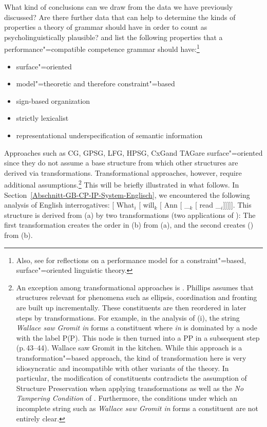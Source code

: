 What kind of conclusions can we draw from the data we have previously discussed? Are there further data that can help to determine the kinds
of properties a theory of grammar should have in order to count as psycholinguistically plausible? \citet*{SWB2003a} and \citet{SW2011a,SW2015a}
list the following properties that a performance"=compatible competence grammar should have:\footnote{%
  Also, see  for reflections on a performance model for a constraint"=based, surface"=oriented linguistic
  theory.
}
\begin{itemize}
\item surface"=oriented
\item model"=theoretic and therefore constraint"=based
\item sign-based organization
\item strictly lexicalist
\item representational underspecification of semantic information
\end{itemize}

\largerpage[2]
\noindent
Approaches such as CG\indexcg, GPSG\indexgpsg, LFG\indexlfg, HPSG\indexhpsg, CxG\indexcxg and TAG\indextag are surface"=oriented
since they do not assume a base structure from which other structures are derived via transformations. Transformational
approaches, however, require additional assumptions.\footnote{%
	An exception among transformational approaches is . Phillips assumes that structures relevant for phenomena such as ellipsis,
	coordination and fronting
	are built up incrementally. These constituents are then reordered in later steps by transformations. For example, in the analysis of (i), the string
	\emph{Wallace saw Gromit in} forms a constituent where \emph{in} is dominated by a node with the label P(P). This node is then turned into a PP
	in a subsequent step (p.\,43--44).
\ea
Wallace saw Gromit in the kitchen.
\z
While this approach is a transformation"=based approach, the kind of transformation here is very idiosyncratic and incompatible with other
variants of the theory. In particular, the modification of constituents contradicts the assumption of Structure Preservation
when applying transformations as well as the \emph{No Tampering Condition} of \citet{Chomsky2008a}. 
Furthermore, the conditions under which an incomplete string such as \emph{Wallace saw Gromit in} forms a constituent are not
entirely clear.
%
} 
This will be briefly illustrated in what follows.
In Section~\ref{Abschnitt-GB-CP-IP-System-Englisch}, we encountered the following analysis of English interrogatives:
\ea
{}[ What$_i$ [ will$_k$ [ Ann [ \_$_k$ [ read \_$_i$]]]]].
\z
This structure is derived from (a) by two transformations (two applications of \movea):
\eal
{}
\zl
The first transformation creates the order in (b) from (a), and the second creates () from 
(b).

